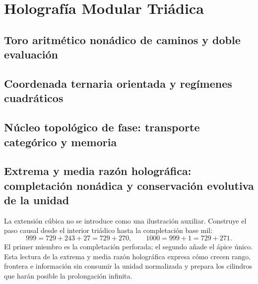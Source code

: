 \part{Holografía Modular Triádica}

\chapter{Toro aritmético nonádico de caminos y doble evaluación}
\label{chap:soporte-aritmetico-rev7}
\HMTDemoteHeadings
\def\HMTAPPFormal{1}

\let\HMTAPPFormal\undefined
\def\HMTAPPDevelopments{1}

\let\HMTAPPDevelopments\undefined

\HMTRestoreHeadings

\chapter{Coordenada ternaria orientada y regímenes cuadráticos}
\label{chap:trit-rev7}
\HMTDemoteHeadings
\def\HMTTRITFormal{1}

\let\HMTTRITFormal\undefined
\def\HMTTRITDevelopments{1}

\let\HMTTRITDevelopments\undefined
\HMTRestoreHeadings

\chapter{Núcleo topológico de fase: transporte categórico y memoria}
\label{chap:tpk-rev7}
\HMTDemoteHeadings





\HMTRestoreHeadings

\chapter[Extrema y media razón holográfica]{Extrema y media razón
holográfica: completación nonádica y conservación evolutiva de la unidad}
\label{chap:completacion-unidad-rev7}
La extensión cúbica no se introduce como una ilustración auxiliar. Construye
el paso causal desde el interior triádico hasta la completación base mil:
\[
999=729+243+27=729+270,
\qquad
1000=999+1=729+271.
\]
El primer miembro es la completación perforada; el segundo añade el ápice
único. Esta lectura de la extrema y media razón holográfica expresa cómo
crecen rango, frontera e información sin consumir la unidad normalizada y
prepara los cilindros que harán posible la prolongación infinita.
\HMTDemoteHeadings


\HMTRestoreHeadings

